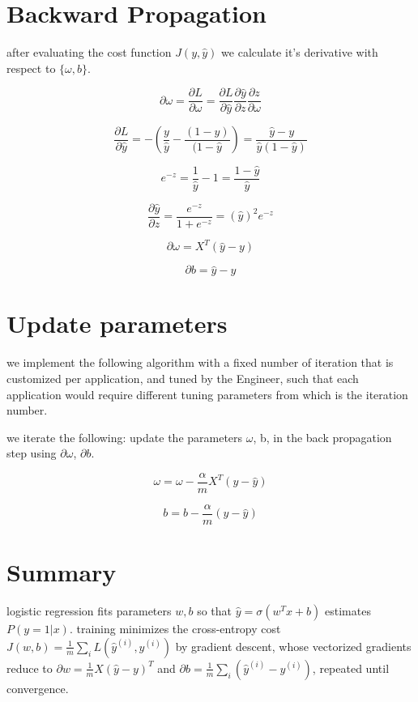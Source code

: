 \documentclass[4apaper,12pt]{book}
\begin{document}
\section{Backward Propagation}
\begin{description}
\item after evaluating the cost function $J(y,\hat{y})$ we calculate it's derivative with respect to  $\{\omega,b\}$.

\item $$\partial{\omega}= \frac{\partial{L}}{\partial{\omega}}=
  \frac{\partial{L}}{\partial{\hat{y}}}
  \frac{\partial{\hat{y}}}{\partial{z}}
  \frac{\partial{z}}{\partial{\omega}}$$
\item $$
  \frac{\partial{L}}{\partial{\hat{y}}} = -
  (\frac{y}{\hat{y}} - \frac{(1-y)}{(1-\hat{y}}) =
  \frac{\hat{y}-y}{\hat{y}(1-\hat{y})}
  $$

\item $$e^{-z}=\frac{1}{\hat{y}} - 1=\frac{1-\hat{y}}{\hat{y}}$$
\item $$
  \frac{\partial{\hat{y}}}{\partial{z}} =
  \frac{e^{-z}}{1+e^{-z}} = (\hat{y})^2e^{-z}
  $$
\item $$ \partial{\omega} = X^T(\hat{y} - y) $$
\item $$ \partial{b} = \hat{y} - y $$
\end{description}

\section{Update parameters}
\begin{description}
  \item we implement the following algorithm with a fixed number of iteration that is customized per application, and tuned by the Engineer, such that each application would require different tuning parameters from which is the iteration number.
\item we iterate the following: update the parameters $\omega$, b, in the back propagation step using $\partial{\omega}$, $\partial{b}$.
\item $$\omega = \omega - \frac{\alpha}{m}X^T(y-\hat{y})$$
\item $$b = b - \frac{\alpha}{m}(y-\hat{y})$$

  \end{description}

\section{Summary}
\begin{description}
\item logistic regression fits parameters $w,b$ so that $\hat{y}=\sigma(w^Tx+b)$ estimates $P(y=1|x)$. training minimizes the cross-entropy cost $J(w,b)=\frac{1}{m}\sum_i L(\hat{y}^{(i)},y^{(i)})$ by gradient descent, whose vectorized gradients reduce to $\partial w=\frac{1}{m}X(\hat{y}-y)^T$ and $\partial b=\frac{1}{m}\sum_i(\hat{y}^{(i)}-y^{(i)})$, repeated until convergence.
\end{description}
\end{document}
